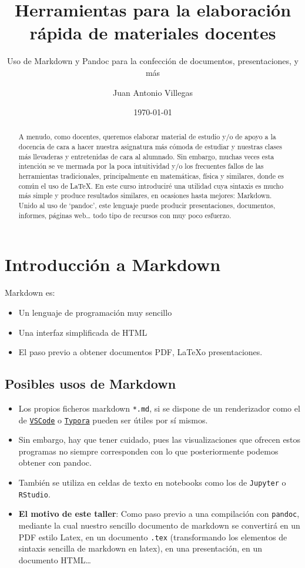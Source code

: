 \documentclass[
]{article}
\title{Herramientas para la elaboración rápida de materiales docentes}
\subtitle{Uso de Markdown y Pandoc para la confección de documentos,
presentaciones, y más}
\author{Juan Antonio Villegas}
\date{\today}
\providecommand{\tightlist}{%
  \setlength{\itemsep}{0pt}\setlength{\parskip}{0pt}}
\begin{document}
\maketitle
\begin{abstract}
A menudo, como docentes, queremos elaborar material de estudio y/o de
apoyo a la docencia de cara a hacer nuestra asignatura más cómoda de
estudiar y nuestras clases más llevaderas y entretenidas de cara al
alumnado. Sin embargo, muchas veces esta intención se ve mermada por la
poca intuitividad y/o los frecuentes fallos de las herramientas
tradicionales, principalmente en matemáticas, física y similares, donde
es común el uso de LaTeX. En este curso introduciré una utilidad cuya
sintaxis es mucho más simple y produce resultados similares, en
ocasiones hasta mejores: Markdown. Unido al uso de `pandoc', este
lenguaje puede producir presentaciones, documentos, informes, páginas
web\ldots{} todo tipo de recursos con muy poco esfuerzo.
\end{abstract}

\section{Introducción a Markdown}\label{introducciuxf3n-a-markdown}

Markdown es:

\begin{itemize}
\tightlist
\item
  Un lenguaje de programación muy sencillo
\item
  Una interfaz simplificada de HTML
\item
  El paso previo a obtener documentos PDF, \LaTeX o presentaciones.
\end{itemize}

\subsection{Posibles usos de Markdown}\label{posibles-usos-de-markdown}

\begin{itemize}
\tightlist
\item
  Los propios ficheros markdown \texttt{*.md}, si se dispone de un
  renderizador como el de
  \href{https://code.visualstudio.com/}{\texttt{VSCode}} o
  \href{https://typora.io/}{\texttt{Typora}} pueden ser útiles por sí
  mismos.
\item
  Sin embargo, hay que tener cuidado, pues las visualizaciones que
  ofrecen estos programas no siempre corresponden con lo que
  posteriormente podemos obtener con pandoc.
\item
  También se utiliza en celdas de texto en notebooks como los de
  \texttt{Jupyter} o \texttt{RStudio}.
\item
  \textbf{El motivo de este taller}: Como paso previo a una compilación
  con \texttt{pandoc}, mediante la cual nuestro sencillo documento de
  markdown se convertirá en un PDF estilo Latex, en un documento
  \texttt{.tex} (transformando los elementos de sintaxis sencilla de
  markdown en latex), en una presentación, en un documento HTML\ldots{}
\end{itemize}
\end{document}

